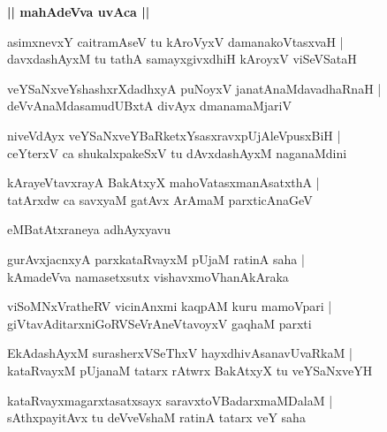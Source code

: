 \documentclass[twoside,12pt,openright]{book}
\newcounter{shloka}[chapter]
\def\uvaca#1{\centerline{{\large\textbf{#1}}}}
\begin{document}
\uvaca{|| mahAdeVva uvAca ||}

\begin{shloka}%
asimxnevxY caitramAseV tu kAroVyxV damanakoVtasxvaH |\\
davxdashAyxM tu tathA samayxgivxdhiH kAroyxV viSeVSataH 
\end{shloka}

\begin{shloka}%
veYSaNxveYshashxrXdadhxyA puNoyxV janatAnaMdavadhaRnaH |\\
deVvAnaMdasamudUBxtA divAyx dmanamaMjariV 
\end{shloka}

\begin{shloka}%
niveVdAyx veYSaNxveYBaRketxYsasxravxpUjAleVpusxBiH |\\
ceYterxV ca shukalxpakeSxV tu dAvxdashAyxM naganaMdini 
\end{shloka}

\begin{shloka}%
kArayeVtavxrayA BakAtxyX mahoVatasxmanAsatxthA |\\
tatArxdw ca savxyaM gatAvx ArAmaM parxticAnaGeV
\end{shloka}

\begin{center}
eMBatAtxraneya adhAyxyavu
\end{center}

\begin{shloka}%
gurAvxjacnxyA parxkataRvayxM pUjaM ratinA saha |\\
kAmadeVva namasetxsutx vishavxmoVhanAkAraka
\end{shloka}

\begin{shloka}%
viSoMNxVratheRV vicinAnxmi kaqpAM kuru mamoVpari |\\
giVtavAditarxniGoRVSeVrAneVtavoyxV gaqhaM parxti
\end{shloka}

\begin{shloka}%
EkAdashAyxM surasherxVSeThxV hayxdhivAsanavUvaRkaM |\\
kataRvayxM pUjanaM tatarx rAtwrx BakAtxyX tu veYSaNxveYH
\end{shloka}

\begin{shloka}%
kataRvayxmagarxtasatxsayx saravxtoVBadarxmaMDalaM |\\
sAthxpayitAvx tu deVveVshaM ratinA tatarx veY saha
\end{shloka}
\end{document}
